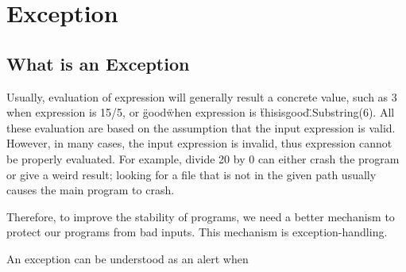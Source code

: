 \documentclass[../main.tex]{subfiles}
\begin{document}
\section{Exception}
\subsection{What is an Exception}
Usually, evaluation of expression will generally result a concrete value, such
as 3 when expression is 15/5, or \"good\" when expression is \"thisisgood\".Substring(6).
All these evaluation are based on the assumption that the input expression
is valid. However, in many cases, the input expression is invalid, thus expression
cannot be properly evaluated. For example, divide 20 by 0 can either crash the
program or give a weird result; looking for a file that is not in the given path
usually causes the main program to crash.

Therefore, to improve the stability of programs, we need a better mechanism to
protect our programs from bad inputs. This mechanism is exception-handling.

An exception can be understood as an alert when
\end{document}

